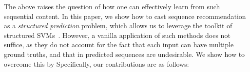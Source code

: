 The above raises the question of how one can effectively learn from such sequential content.
In this paper, we show how to cast sequence recommendation as a \emph{structured prediction} problem,
which allows us to leverage the toolkit of structured SVMs~\citep{tsochantaridis2005large}.
However, a vanilla application of such methods does not suffice,
as they do not account for the fact that each input can have multiple ground truths,
and that  in predicted sequences are undesirable.
We show how to overcome this by
Specifically, our contributions are as follows:
